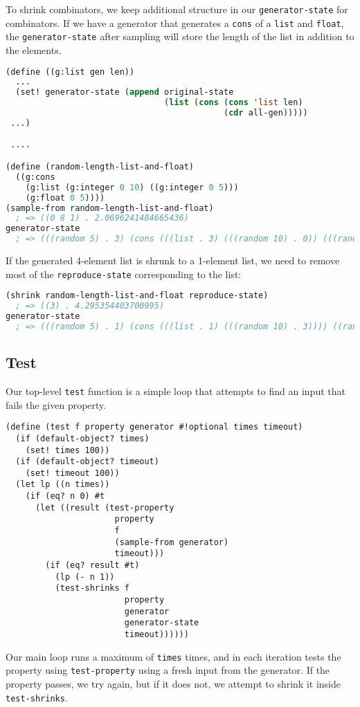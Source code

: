 To shrink combinators, we keep additional structure in our \verb|generator-state| for combinators. If we have a generator that generates a \verb|cons| of a \verb|list| and \verb|float|, the \verb|generator-state| after sampling will store the length of the list in addition to the elements.

\begin{lstlisting}[language=lisp]
(define ((g:list gen len))
  ...
  (set! generator-state (append original-state
                                (list (cons (cons 'list len)
                                            (cdr all-gen)))))
 ...)

 ....

(define (random-length-list-and-float)
  ((g:cons
 	(g:list (g:integer 0 10) ((g:integer 0 5)))
 	(g:float 0 5))))
(sample-from random-length-list-and-float) 
  ; => ((0 8 1) . 2.0696241484665436)
generator-state 
  ; => (((random 5) . 3) (cons (((list . 3) (((random 10) . 0)) (((random 10) . 8)) (((random 10) . 1)))) ((random-real) . .41392482969330874)))
\end{lstlisting}
If the generated 4-element list is shrunk to a 1-element list, we need to remove most of the \verb|reproduce-state| corresponding to the list:
\begin{lstlisting}[language=lisp]
(shrink random-length-list-and-float reproduce-state) 
  ; => ((3) . 4.295354403700995)
generator-state
  ; => (((random 5) . 1) (cons (((list . 1) (((random 10) . 3)))) ((random-real) . .859070880740199)))
\end{lstlisting}

\subsection{Test}

Our top-level \verb|test| function is a simple loop that attempts to find an input that fails the given property.
\begin{lstlisting}
(define (test f property generator #!optional times timeout)
  (if (default-object? times)
    (set! times 100))
  (if (default-object? timeout)
    (set! timeout 100))
  (let lp ((n times))
    (if (eq? n 0) #t
      (let ((result (test-property 
                      property 
                      f 
                      (sample-from generator)
                      timeout)))
        (if (eq? result #t) 
          (lp (- n 1))
          (test-shrinks f 
                        property 
                        generator 
                        generator-state 
                        timeout))))))
\end{lstlisting}
Our main loop runs a maximum of \verb|times| times, and in each iteration tests the property using \verb|test-property| using a fresh input from the generator. If the property passes, we try again, but if it does not, we attempt to shrink it inside \verb|test-shrinks|.

